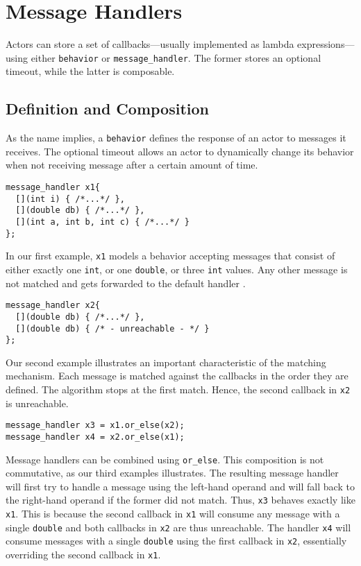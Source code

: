 \section{Message Handlers}
\label{message-handler}

Actors can store a set of callbacks---usually implemented as lambda
expressions---using either \lstinline^behavior^ or \lstinline^message_handler^.
The former stores an optional timeout, while the latter is composable.

\subsection{Definition and Composition}

As the name implies, a \lstinline^behavior^ defines the response of an actor to
messages it receives. The optional timeout allows an actor to dynamically
change its behavior when not receiving message after a certain amount of time.

\begin{lstlisting}
message_handler x1{
  [](int i) { /*...*/ },
  [](double db) { /*...*/ },
  [](int a, int b, int c) { /*...*/ }
};
\end{lstlisting}

In our first example, \lstinline^x1^ models a behavior accepting messages that
consist of either exactly one \lstinline^int^, or one \lstinline^double^, or
three \lstinline^int^ values. Any other message is not matched and gets
forwarded to the default handler .

\begin{lstlisting}
message_handler x2{
  [](double db) { /*...*/ },
  [](double db) { /* - unreachable - */ }
};
\end{lstlisting}

Our second example illustrates an important characteristic of the matching
mechanism. Each message is matched against the callbacks in the order they are
defined. The algorithm stops at the first match. Hence, the second callback in
\lstinline^x2^ is unreachable.

\begin{lstlisting}
message_handler x3 = x1.or_else(x2);
message_handler x4 = x2.or_else(x1);
\end{lstlisting}

Message handlers can be combined using \lstinline^or_else^. This composition is
not commutative, as our third examples illustrates. The resulting message
handler will first try to handle a message using the left-hand operand and will
fall back to the right-hand operand if the former did not match. Thus,
\lstinline^x3^ behaves exactly like \lstinline^x1^. This is because the second
callback in \lstinline^x1^ will consume any message with a single
\lstinline^double^ and both callbacks in \lstinline^x2^ are thus unreachable.
The handler \lstinline^x4^ will consume messages with a single
\lstinline^double^ using the first callback in \lstinline^x2^, essentially
overriding the second callback in \lstinline^x1^.


